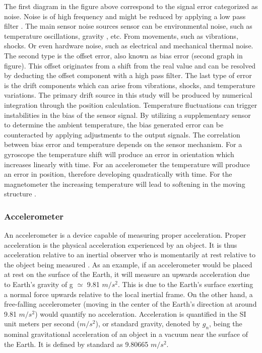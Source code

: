 The first diagram in the figure above correspond to the signal error categorized as noise. Noise is of high frequency and might be reduced by applying a low pass filter \cite{kaiser1977data}. The main sensor noise sources sensor can be environmental noise, such as temperature oscillations, gravity , etc. From movements, such as vibrations, shocks. Or even hardware noise, such as electrical and mechanical thermal noise. The second type is the offset error, also known as bias error (second graph in figure). This offset originates from a shift from the real value and can be resolved by deducting the offset component with a high pass filter. The last type of error is the drift components which can arise from vibrations, shocks, and temperature variations. The primary drift source in this study will be produced by numerical integration through the position calculation. Temperature fluctuations can trigger instabilities in the bias of the sensor signal. By utilizing a supplementary sensor to determine the ambient temperature, the bias generated error can be counteracted by applying adjustments to the output signals. The correlation between bias error and temperature depends on the sensor mechanism. For a gyroscope the temperature shift will produce an error in orientation which increases linearly with time. For an accelerometer the temperature will produce an error in position, therefore developing quadratically with time. For the magnetometer the increasing temperature will lead to softening in the moving structure \cite{el2007temperature}.

\subsubsection{Accelerometer}

An accelerometer is a device capable of measuring proper acceleration. Proper acceleration is the physical acceleration experienced by an object. It is thus acceleration relative to an inertial observer who is momentarily at rest relative to the object being measured \cite{pons2019observers}. As an example, if an accelerometer would be placed at rest on the surface of the Earth, it will measure an upwards acceleration due to Earth's gravity of g $\simeq$ 9.81 $m/s^2$. This is due to the Earth's surface exerting a normal force upwards relative to the local inertial frame. On the other hand, a free-falling accelerometer (moving in the center of the Earth's direction at around 9.81 $m/s^2$) would quantify no acceleration. Acceleration is quantified in the SI unit meters per second ($m/s^2$), or standard gravity, denoted by $g_n$, being the nominal gravitational acceleration of an object in a vacuum near the surface of the Earth. It is defined by standard as 9.80665 $m/s^2$.

